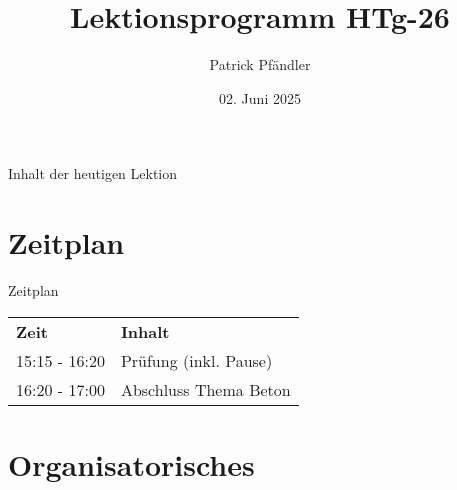 



\title{\textbf{Lektionsprogramm HTg-26}}
\author{Patrick Pfändler}
\date{02. Juni   2025}




\frame{\titlepage}




\folieFragen





\begin{frame}{Inhalt der heutigen Lektion}
    \tableofcontents
\end{frame}

\section{Zeitplan}
\BlueSectionSlide

\begin{frame}{Zeitplan}
    \begin{table}[]
        \begin{tabular}{p{}p{}}
            \rowcolor{blue}
            \color{white}\textbf{Zeit} & \color{white}\textbf{Inhalt} \\ 
            15:15 - 16:20 & Prüfung (inkl. Pause) \\ 
            16:20 - 17:00 & Abschluss Thema Beton  \\
        \end{tabular}
    \end{table}
\end{frame}


\section{Organisatorisches}
\BlueSectionSlide


